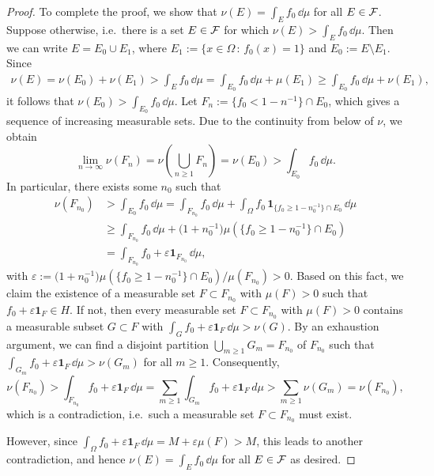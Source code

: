 \begin{proof}
	To complete the proof, we show that $\nu(E)=\int_E f_0\,\dd\mu$ for all $E\in\mathcal F$. Suppose otherwise, i.e.\ there is a set $E\in\mathcal F$ for which $\nu(E)>\int_E f_0\,\dd\mu$. Then we can write $E=E_0\cup E_1$, where $E_1:= \{ x\in\Omega\,:\, f_0(x)=1\}$ and $E_0:= E\setminus E_1$. Since
	\begin{align*}
		\nu(E) = \nu(E_0) + \nu(E_1) > \int_E f_0\,\dd\mu = \int_{E_0} f_0\,\dd\mu + \mu(E_1) \ge \int_{E_0} f_0\,\dd\mu + \nu(E_1),
	\end{align*}
	it follows that $\nu(E_0)>\int_{E_0} f_0\,\dd\mu$. Let $F_n:= \{f_0<1-n^{-1}\}\cap E_0$, which gives a sequence of increasing measurable sets. Due to the continuity from below of $\nu$, we obtain
	\[
		\lim_{n\to\infty}\nu(F_n) = \nu\left(\bigcup_{n\ge 1} F_n\right) = \nu(E_0)>\int_{E_0} f_0\,\dd\mu.
	\]
	In particular, there exists some $n_0$ such that
	\begin{align*}
		\nu(F_{n_0}) &> \int_{E_0} f_0\,\dd\mu = \int_{F_{n_0}}f_0\,\dd\mu + \int_\Omega f_0\,\mathbf{1}_{\{f_0\ge 1-n_0^{-1}\}\cap E_0}\,\dd\mu \\
		&\ge \int_{F_{n_0}}f_0\, \dd\mu + \bigl(1 + n_0^{-1}\bigr)\mu(\{f_0\ge 1-n_0^{-1}\}\cap E_0) \\
		&= \int_{F_{n_0}}f_0 + \varepsilon\mathbf{1}_{F_{n_0}}\, \dd\mu,
	\end{align*}
	with $\varepsilon := \bigl(1 + n_0^{-1}\bigr)\mu(\{f_0\ge 1-n_0^{-1}\}\cap E_0)/\mu(F_{n_0}) >0$. Based on this fact, we claim the existence of a measurable set $F\subset F_{n_0}$ with $\mu(F)>0$ such that $f_0 + \varepsilon\mathbf{1}_F\in H$. If not, then every measurable set $F\subset F_{n_0}$ with $\mu(F)>0$ contains a measurable subset $G\subset F$ with $\int_G f_0 + \varepsilon \mathbf{1}_F\,\dd\mu > \nu(G)$. By an exhaustion argument, we can find a disjoint partition $\bigcup_{m\ge 1} G_m = F_{n_0}$ of $F_{n_0}$ such that $\int_{G_m} f_0 + \varepsilon \mathbf{1}_F\,\dd\mu > \nu(G_m)$ for all $m\ge 1$. Consequently,
\[
	\nu(F_{n_0}) > \int_{F_{n_0}}f_0 + \varepsilon\mathbf{1}_{F}\, \dd\mu = \sum_{m\ge 1} \int_{G_m} f_0 + \varepsilon \mathbf{1}_F\,d\mu > \sum_{m\ge 1} \nu(G_m) = \nu(F_{n_0}),
\]
which is a contradiction, i.e.\ such a measurable set $F\subset F_{n_0}$ must exist. 

However, since $\int_\Omega f_0 + \varepsilon\mathbf{1}_F\,\dd\mu = M + \varepsilon\mu(F) > M$, this leads to another contradiction, and hence $\nu(E)=\int_E f_0\,\dd\mu$ for all $E\in\mathcal F$ as desired.
\end{proof}


